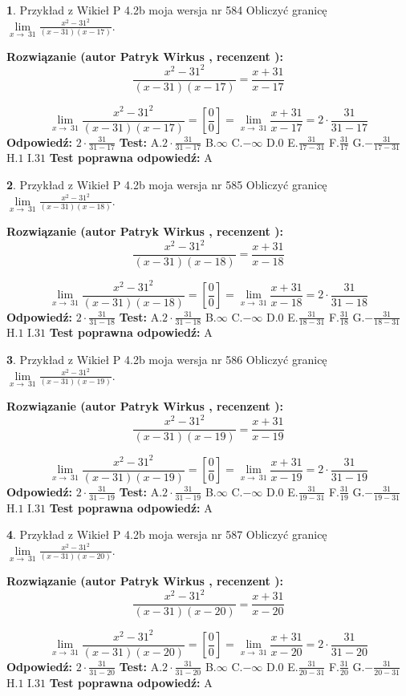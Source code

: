 \documentclass[12pt, a4paper]{article}
\theoremstyle{definition} %
\newtheorem{zad}{}
\newcommand{\zadStart}[1]{\begin{zad}#1\newline}
\newcommand{\zadStop}{\end{zad}}
\newcommand{\rozwStart}[2]{\noindent \textbf{Rozwiązanie (autor #1 , recenzent #2): }\newline}
\newcommand{\rozwStop}{\newline}
\newcommand{\odpStart}{\noindent \textbf{Odpowiedź:}\newline}
\newcommand{\odpStop}{\newline}
\newcommand{\testStart}{\noindent \textbf{Test:}\newline}
\newcommand{\testStop}{\newline}
\newcommand{\kluczStart}{\noindent \textbf{Test poprawna odpowiedź:}\newline}
\newcommand{\kluczStop}{\newline}
\begin{document}
\zadStart{Przykład z Wikieł P 4.2b moja wersja nr 584}
Obliczyć granicę $\lim\limits_{x\to\ 31}\frac{x^{2}-31^{2}}{(x-31)(x-17)}$.
\zadStop
\rozwStart{Patryk Wirkus}{}
$$\frac{x^{2}-31^{2}}{(x-31)(x-17)}=\frac{x+31}{x-17}$$

$$\lim\limits_{x\to\ 31}\frac{x^{2}-31^{2}}{(x-31)(x-17)}=[\frac{0}{0}]=\lim\limits_{x\to\ 31}\frac{x+31}{x-17}=2 \cdot \frac{31}{31-17}$$
\rozwStop
\odpStart
$2 \cdot \frac{31}{31-17}$
\odpStop
\testStart
A.$2 \cdot \frac{31}{31-17}$
B.$\infty$
C.$-\infty$
D.$0$
E.$\frac{31}{17-31}$
F.$\frac{31}{17}$
G.$-\frac{31}{17-31}$
H.$1$
I.$31$
\testStop
\kluczStart
A
\kluczStop



\zadStart{Przykład z Wikieł P 4.2b moja wersja nr 585}
Obliczyć granicę $\lim\limits_{x\to\ 31}\frac{x^{2}-31^{2}}{(x-31)(x-18)}$.
\zadStop
\rozwStart{Patryk Wirkus}{}
$$\frac{x^{2}-31^{2}}{(x-31)(x-18)}=\frac{x+31}{x-18}$$

$$\lim\limits_{x\to\ 31}\frac{x^{2}-31^{2}}{(x-31)(x-18)}=[\frac{0}{0}]=\lim\limits_{x\to\ 31}\frac{x+31}{x-18}=2 \cdot \frac{31}{31-18}$$
\rozwStop
\odpStart
$2 \cdot \frac{31}{31-18}$
\odpStop
\testStart
A.$2 \cdot \frac{31}{31-18}$
B.$\infty$
C.$-\infty$
D.$0$
E.$\frac{31}{18-31}$
F.$\frac{31}{18}$
G.$-\frac{31}{18-31}$
H.$1$
I.$31$
\testStop
\kluczStart
A
\kluczStop



\zadStart{Przykład z Wikieł P 4.2b moja wersja nr 586}
Obliczyć granicę $\lim\limits_{x\to\ 31}\frac{x^{2}-31^{2}}{(x-31)(x-19)}$.
\zadStop
\rozwStart{Patryk Wirkus}{}
$$\frac{x^{2}-31^{2}}{(x-31)(x-19)}=\frac{x+31}{x-19}$$

$$\lim\limits_{x\to\ 31}\frac{x^{2}-31^{2}}{(x-31)(x-19)}=[\frac{0}{0}]=\lim\limits_{x\to\ 31}\frac{x+31}{x-19}=2 \cdot \frac{31}{31-19}$$
\rozwStop
\odpStart
$2 \cdot \frac{31}{31-19}$
\odpStop
\testStart
A.$2 \cdot \frac{31}{31-19}$
B.$\infty$
C.$-\infty$
D.$0$
E.$\frac{31}{19-31}$
F.$\frac{31}{19}$
G.$-\frac{31}{19-31}$
H.$1$
I.$31$
\testStop
\kluczStart
A
\kluczStop



\zadStart{Przykład z Wikieł P 4.2b moja wersja nr 587}
Obliczyć granicę $\lim\limits_{x\to\ 31}\frac{x^{2}-31^{2}}{(x-31)(x-20)}$.
\zadStop
\rozwStart{Patryk Wirkus}{}
$$\frac{x^{2}-31^{2}}{(x-31)(x-20)}=\frac{x+31}{x-20}$$

$$\lim\limits_{x\to\ 31}\frac{x^{2}-31^{2}}{(x-31)(x-20)}=[\frac{0}{0}]=\lim\limits_{x\to\ 31}\frac{x+31}{x-20}=2 \cdot \frac{31}{31-20}$$
\rozwStop
\odpStart
$2 \cdot \frac{31}{31-20}$
\odpStop
\testStart
A.$2 \cdot \frac{31}{31-20}$
B.$\infty$
C.$-\infty$
D.$0$
E.$\frac{31}{20-31}$
F.$\frac{31}{20}$
G.$-\frac{31}{20-31}$
H.$1$
I.$31$
\testStop
\kluczStart
A
\kluczStop
\end{document}
